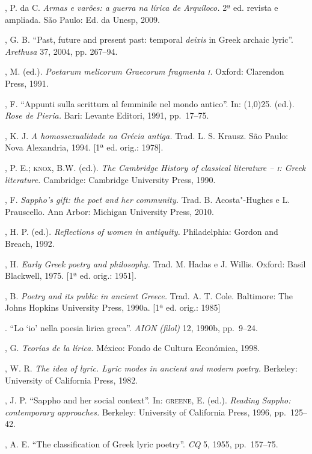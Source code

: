 \begin{bibliohedra}
, P. da C. \textit{Armas e varões: a guerra na
lírica de Arquíloco.} 2ª ed. revista e ampliada. São Paulo: Ed. da Unesp, 2009.

, G. B. “Past, future and present past: temporal
\textit{deixis} in Greek archaic lyric”. \textit{Arethusa} 37, 2004, pp.
267--94.

, M. (ed.). \textit{Poetarum melicorum Graecorum fragmenta \textsc{i}.}
Oxford: Clarendon Press, 1991.

, F. “Appunti sulla scrittura al femminile nel mondo antico''.
In: \line(1,0){25}. (ed.). \textit{Rose} \textit{de Pieria.} Bari: Levante Editori,
1991, pp.~17--75.

, K. J.  \textit{A homossexualidade na Grécia antiga.}
Trad. L. S. Krausz. São Paulo: Nova Alexandria, 1994. [1ª ed. orig.: 1978].

, P. E.; \textsc{knox}, B.W. (ed.). \textit{The Cambridge History of
classical literature -- \textsc{i}: Greek literature.} Cambridge: Cambridge University
Press, 1990.

, F. \textit{Sappho’s gift: the poet and her community.} Trad.
B. Acosta"-Hughes e L. Prauscello. Ann Arbor: Michigan University Press, 2010.

, H. P. (ed.). \textit{Reflections of women in antiquity.}
Philadelphia: Gordon and Breach, 1992.

, H. \textit{Early Greek poetry and philosophy.} Trad. M. Hadas
e J. Willis. Oxford: Basil Blackwell, 1975. [1ª ed. orig.: 1951]. 

, B. \textit{Poetry and its public in ancient Greece.} Trad. A.
T. Cole. Baltimore: The Johns Hopkins University Press, 1990a.
[1ª ed. orig.: 1985]

\titidem. “Lo ‘io’ nella poesia lirica greca”. \textit{AION (filol)} 12,
1990b, pp.~9--24.

, G. \textit{Teorías de la lírica.} México: Fondo de
Cultura Económica, 1998.

, W. R. \textit{The idea of lyric. Lyric modes in ancient and
modern poetry.} Berkeley: University of California Press, 1982.

, J. P. “Sappho and her social context”. In: \textsc{greene}, E.
(ed.). \textit{Reading Sappho: contemporary approaches.} Berkeley: University
of California Press, 1996, pp.~125--42.

, A. E. “The classification of Greek lyric poetry”. \textit{CQ}
5, 1955, pp.~157--75.


\end{bibliohedra}
